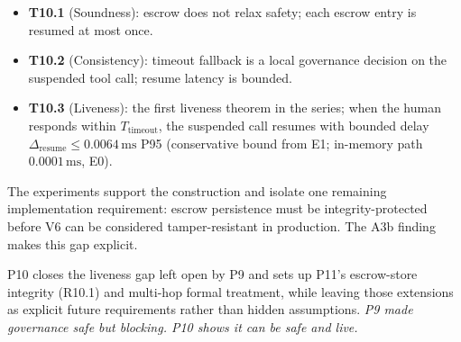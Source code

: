 \documentclass[11pt]{article}
\newcommand{\Ttimeout}{T_{\mathrm{timeout}}}
\newcommand{\Dresume}{\Delta_{\mathrm{resume}}}
\begin{document}
\begin{itemize}[itemsep=2pt]
  \item \textbf{T10.1} (Soundness): escrow does not relax safety;
    each escrow entry is resumed at most once.
  \item \textbf{T10.2} (Consistency): timeout fallback is a local
    governance decision on the suspended tool call; resume latency
    is bounded.
  \item \textbf{T10.3} (Liveness): the first liveness theorem in the
    series; when the human responds within $\Ttimeout$, the suspended
    call resumes with bounded delay $\Dresume \le 0.0064\,\si{\milli\second}$
    P95 (conservative bound from E1; in-memory path $0.0001\,\si{\milli\second}$, E0).
\end{itemize}

The experiments support the construction and isolate one remaining
implementation requirement: escrow persistence must be
integrity-protected before V6 can be considered tamper-resistant in
production. The A3b finding makes this gap explicit.

P10 closes the liveness gap left open by P9 and sets up P11's
escrow-store integrity (R10.1) and multi-hop formal treatment, while
leaving those extensions as explicit future requirements rather than
hidden assumptions. \emph{P9 made governance safe but blocking.
P10 shows it can be safe and live.}



\end{document}
